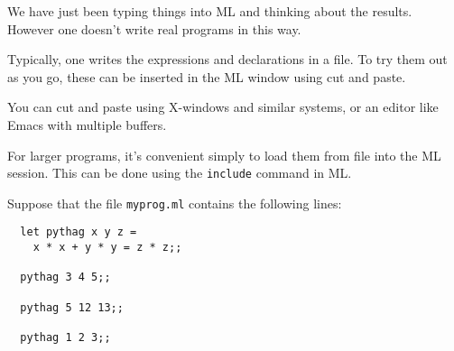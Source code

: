 \begin{slide*}


\vspace*{0.5cm}

We have just been typing things into ML and thinking about the results. However
one doesn't write real programs in this way.

Typically, one writes the expressions and declarations in a file. To try them
out as you go, these can be inserted in the ML window using cut and paste.

You can cut and paste using X-windows and similar systems, or an editor like
Emacs with multiple buffers.

For larger programs, it's convenient simply to load them from file into the ML
session. This can be done using the {\black \tt include} command in ML.

\end{slide*}

\begin{slide*}


\vspace*{0.5cm}

Suppose that the file {\black \tt myprog.ml} contains the following lines:

\begin{black}\begin{verbatim}
  let pythag x y z =
    x * x + y * y = z * z;;

  pythag 3 4 5;;

  pythag 5 12 13;;

  pythag 1 2 3;;
\end{verbatim}\end{black}

\end{slide*}



